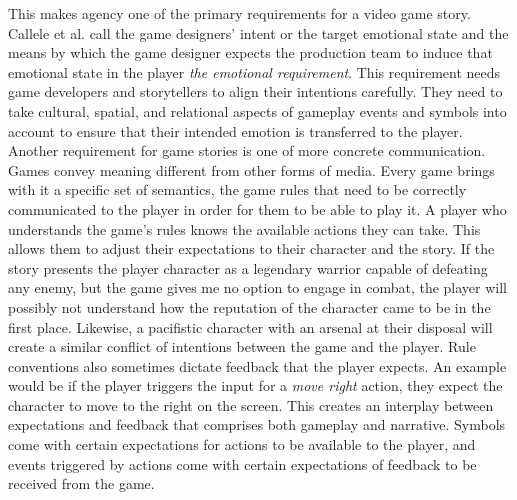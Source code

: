 This makes agency one of the primary requirements for a video game story. Callele et al. call the game designers’ intent or the target emotional state and the means by which the game designer expects the production team to induce that emotional state in the player \textit{the emotional requirement}. This requirement needs game developers and storytellers to align their intentions carefully. They need to take cultural, spatial, and relational aspects of gameplay events and symbols into account to ensure that their intended emotion is transferred to the player.~\cite{Callele2008}\\
Another requirement for game stories is one of more concrete communication. Games convey meaning different from other forms of media. Every game brings with it a specific set of semantics, the game rules that need to be correctly communicated to the player in order for them to be able to play it. A player who understands the game’s rules knows the available actions they can take. This allows them to adjust their expectations to their character and the story. If the story presents the player character as a legendary warrior capable of defeating any enemy, but the game gives me no option to engage in combat, the player will possibly not understand how the reputation of the character came to be in the first place. Likewise, a pacifistic character with an arsenal at their disposal will create a similar conflict of intentions between the game and the player. Rule conventions also sometimes dictate feedback that the player expects. An example would be if the player triggers the input for a \textit{move right} action, they expect the character to move to the right on the screen. This creates an interplay between expectations and feedback that comprises both gameplay and narrative. Symbols come with certain expectations for actions to be available to the player, and events triggered by actions come with certain expectations of feedback to be received from the game.
